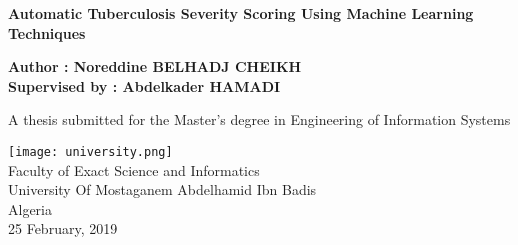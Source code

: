 \begin{titlepage}
   \begin{center}
       \vspace*{1cm}
 
       \large \textbf{Automatic Tuberculosis Severity Scoring Using Machine Learning Techniques}
        \normalsize
       \vspace{0.5cm}
 
       \vspace{1.5cm}
 
       \textbf{Author : Noreddine BELHADJ CHEIKH}\\
       \textbf{Supervised by : Abdelkader HAMADI }
        \vspace{0.5cm}
 
       \vspace{1.5cm}
 
       A thesis submitted for the Master's degree 
       in Engineering of Information Systems
       \vspace{0.5cm}
 
       \vspace{1.5cm}
       
       \texttt{[image: university.png]}\\
       \vfill
       Faculty of Exact Science and Informatics\\
       University Of Mostaganem Abdelhamid Ibn Badis\\
       Algeria\\
       25 February, 2019
    
   \end{center}
\end{titlepage}
 
